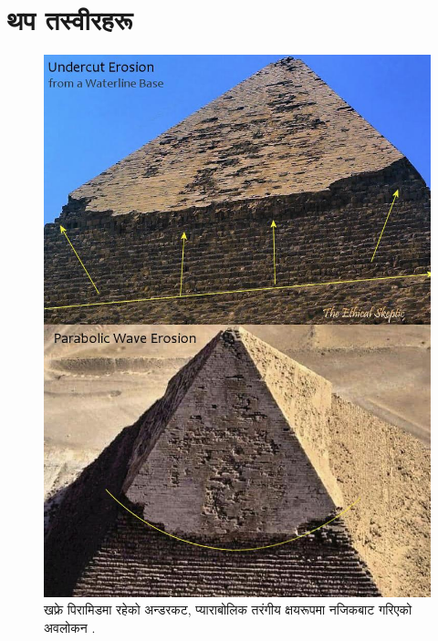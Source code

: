 \documentclass[10pt,twocolumn,letterpaper]{article}
\begin{document}
\section{थप तस्वीरहरू}
\begin{figure}[H]
\begin{center}
   \includegraphics[width=1\linewidth]{wave.jpg}
\end{center}
   \caption{खफ्रे पिरामिडमा रहेको अन्डरकट, प्याराबोलिक तरंगीय क्षयरूपमा नजिकबाट गरिएको अवलोकन \cite{27}.}
\label{fig:19}
\label{fig:onecol}
\end{figure}
\end{document}
